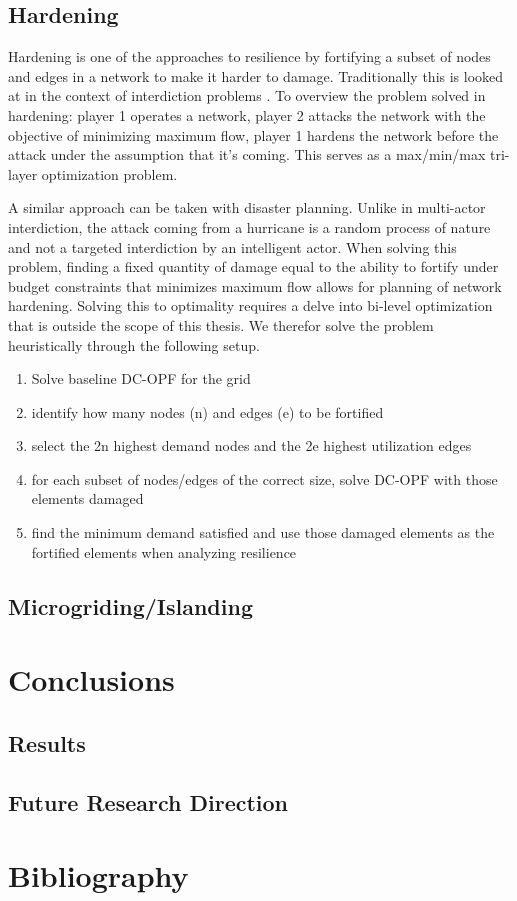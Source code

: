 \documentclass{article}
\begin{document}
	\subsection{Hardening}
	
	Hardening is one of the approaches to resilience by fortifying a subset of nodes and edges in a network to make it harder to damage. Traditionally this is looked at in the context of interdiction problems \cite{ChurchEA2007}. To overview the problem solved in hardening: player 1 operates a network, player 2 attacks the network with the objective of minimizing maximum flow, player 1 hardens the network before the attack under the assumption that it's coming. This serves as a max/min/max tri-layer optimization problem.
	
	A similar approach can be taken with disaster planning. Unlike in multi-actor interdiction, the attack coming from a hurricane is a random process of nature and not a targeted interdiction by an intelligent actor. When solving this problem, finding a fixed quantity of damage equal to the ability to fortify under budget constraints that minimizes maximum flow allows for planning of network hardening. Solving this to optimality requires a delve into bi-level optimization that is outside the scope of this thesis. We therefor solve the problem heuristically through the following setup.
	
	\begin{enumerate}
		
	\item Solve baseline DC-OPF for the grid
	\item identify how many nodes (n) and edges (e) to be fortified
	\item select the 2n highest demand nodes and the 2e highest utilization edges
	\item for each subset of nodes/edges of the correct size, solve DC-OPF with those elements damaged
	\item find the minimum demand satisfied and use those damaged elements as the fortified elements when analyzing resilience 
	\end{enumerate}
		
	\subsection{Microgriding/Islanding}
	\section{Conclusions}
	\subsection{Results}
	\subsection{Future Research Direction}
	\section{Bibliography}
	
	
\end{document}

